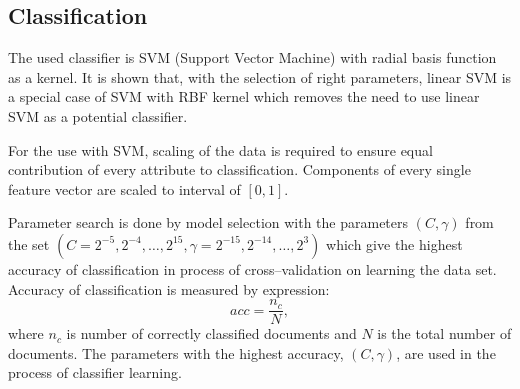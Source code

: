 \documentclass[11pt,english]{article}
\begin{document}
\begin{multicols}{2}
\section{Classification}

The used classifier is SVM (Support Vector Machine) with radial basis
function as a kernel. It is shown that, with the selection of right parameters, linear
SVM is a special case of SVM with RBF kernel \citep{keerthi2003asymptotic} which
removes the need to use linear SVM as a potential classifier.

For the use with SVM, scaling of the data is required to ensure equal contribution of
every attribute to classification. Components of every single feature vector are scaled
to interval of $[0, 1]$.

Parameter search is done by model selection with the parameters $(C, \gamma)$ from
the set $\left (C = {2^{-5}, 2^{-4}, \ldots , 2^{15}},  \gamma = {2^{-15}, 2^{-14},
\ldots, 2^3} \right )$ \citep{CC01a} which give the highest accuracy of
classification in process of cross--validation on learning the data set. Accuracy
of classification is measured by expression:
\begin{equation}
acc = \frac{n_c}{N}, %
\end{equation}
where $n_c$ is number of correctly classified documents and $N$ is the total number of
documents. The parameters with the highest accuracy, $(C, \gamma)$,
are used in the process of classifier learning.



\end{multicols}
\end{document}
